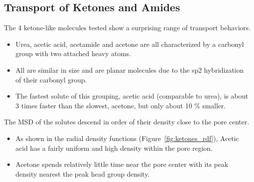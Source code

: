 \documentclass{article}
\begin{document}
  

  \subsection*{Transport of Ketones and Amides}
  
  The 4 ketone-like molecules tested show a surprising range of transport behaviors.
  \begin{itemize}
    \item Urea, acetic acid, acetamide and acetone are all characterized by a carbonyl group
    with two attached heavy atoms. 
    \item All are similar in size and are planar molecules due to the sp2 hybridization of
    their carbonyl group.
    \item The fastest solute of this grouping, acetic acid (comparable to urea), is about
    3 times faster than the slowest, acetone, but only about 10 \% smaller.
  \end{itemize}
  
  \noindent The MSD of the solutes descend in order of their density close to the pore center.
  \begin{itemize}
    \item As shown in the radial density functions (Figure~\ref{fig:ketones_rdf}), 
    Acetic acid has a fairly uniform and high density within the pore region.
    \item Acetone spends relatively little time near the pore center with its
    peak density nearest the peak head group density.
  \end{itemize}
  
\end{document}
